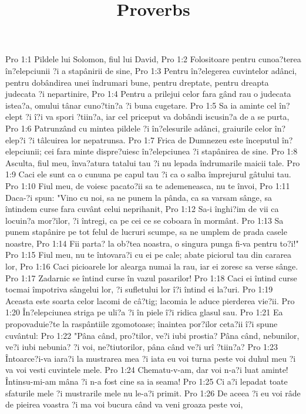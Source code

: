 

\title{Proverbs}

Pro 1:1  Pildele lui Solomon, fiul lui David,
Pro 1:2  Folositoare pentru cunoa?terea în?elepciunii ?i a stapânirii de sine,
Pro 1:3  Pentru în?elegerea cuvintelor adânci, pentru dobândirea unei îndrumari bune, pentru dreptate, pentru dreapta judecata ?i nepartinire,
Pro 1:4  Pentru a prilejui celor fara gând rau o judecata istea?a, omului tânar cuno?tin?a ?i buna cugetare.
Pro 1:5  Sa ia aminte cel în?elept ?i î?i va spori ?tiin?a, iar cel priceput va dobândi iscusin?a de a se purta,
Pro 1:6  Patrunzând cu mintea pildele ?i în?elesurile adânci, graiurile celor în?elep?i ?i tâlcuirea lor nepatrunsa.
Pro 1:7  Frica de Dumnezeu este începutul în?elepciunii; cei fara minte dispre?uiesc în?elepciunea ?i stapânirea de sine.
Pro 1:8  Asculta, fiul meu, înva?atura tatalui tau ?i nu lepada îndrumarile maicii tale.
Pro 1:9  Caci ele sunt ca o cununa pe capul tau ?i ca o salba împrejurul gâtului tau.
Pro 1:10  Fiul meu, de voiesc pacato?ii sa te ademeneasca, nu te învoi,
Pro 1:11  Daca-?i spun: "Vino cu noi, sa ne punem la pânda, ca sa varsam sânge, sa întindem curse fara cuvânt celui neprihanit,
Pro 1:12  Sa-i înghi?im de vii ca locuin?a mor?ilor, ?i întregi, ca pe cei ce se coboara în mormânt.
Pro 1:13  Sa punem stapânire pe tot felul de lucruri scumpe, sa ne umplem de prada casele noastre,
Pro 1:14  Fii parta? la ob?tea noastra, o singura punga fi-va pentru to?i!"
Pro 1:15  Fiul meu, nu te întovara?i cu ei pe cale; abate piciorul tau din cararea lor,
Pro 1:16  Caci picioarele lor alearga numai la rau, iar ei zoresc sa verse sânge.
Pro 1:17  Zadarnic se întind curse în vazul pasarilor!
Pro 1:18  Caci ei întind curse tocmai împotriva sângelui lor, ?i sufletului lor î?i întind ei la?uri.
Pro 1:19  Aceasta este soarta celor lacomi de câ?tig; lacomia le aduce pierderea vie?ii.
Pro 1:20  În?elepciunea striga pe uli?a ?i în piele î?i ridica glasul sau.
Pro 1:21  Ea propovaduie?te la raspântiile zgomotoase; înaintea por?ilor ceta?ii î?i spune cuvântul:
Pro 1:22  "Pâna când, pro?tilor, ve?i iubi prostia? Pâna când, nebunilor, ve?i iubi nebunia? ?i voi, ne?tiutorilor, pâna când ve?i urî ?tiin?a?
Pro 1:23  Întoarce?i-va iara?i la mustrarea mea ?i iata eu voi turna peste voi duhul meu ?i va voi vesti cuvintele mele.
Pro 1:24  Chematu-v-am, dar voi n-a?i luat aminte! Întinsu-mi-am mâna ?i n-a fost cine sa ia seama!
Pro 1:25  Ci a?i lepadat toate sfaturile mele ?i mustrarile mele nu le-a?i primit.
Pro 1:26  De aceea ?i eu voi râde de pieirea voastra ?i ma voi bucura când va veni groaza peste voi,
